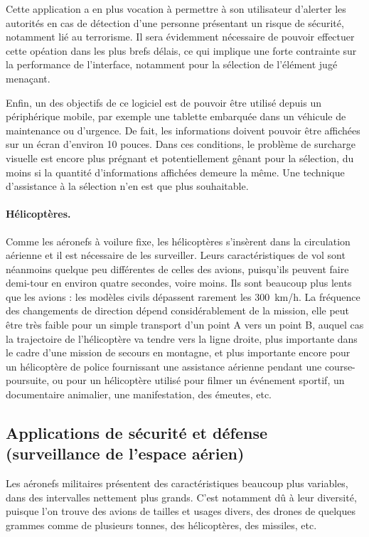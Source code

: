 	Cette application a en plus vocation à permettre à son utilisateur d'alerter les autorités en cas de détection d'une personne présentant un risque de sécurité, notamment lié au terrorisme. Il sera évidemment nécessaire de pouvoir effectuer cette opéation dans les plus brefs délais, ce qui implique une forte contrainte sur la performance de l'interface, notamment pour la sélection de l'élément jugé menaçant.
	
	Enfin, un des objectifs de ce logiciel est de pouvoir être utilisé depuis un périphérique mobile, par exemple une tablette embarquée dans un véhicule de maintenance ou d'urgence. De fait, les informations doivent pouvoir être affichées sur un écran d'environ 10 pouces. Dans ces conditions, le problème de surcharge visuelle est encore plus prégnant et potentiellement gênant pour la sélection, du moins si la quantité d'informations affichées demeure la même. Une technique d'assistance à la sélection n'en est que plus souhaitable.

	\paragraph{Hélicoptères.}
	Comme les aéronefs à voilure fixe, les hélicoptères s'insèrent dans la circulation aérienne et il est nécessaire de les surveiller. Leurs caractéristiques de vol sont néanmoins quelque peu différentes de celles des avions, puisqu'ils peuvent faire demi-tour en environ quatre secondes, voire moins. Ils sont beaucoup plus lents que les avions : les modèles civils dépassent rarement les 300~km/h. La fréquence des changements de direction dépend considérablement de la mission, elle peut être très faible pour un simple transport d'un point A vers un point B, auquel cas la trajectoire de l'hélicoptère va tendre vers la ligne droite, plus importante dans le cadre d'une mission de secours en montagne, et plus importante encore pour un hélicoptère de police fournissant une assistance aérienne pendant une course-poursuite, ou pour un hélicoptère utilisé pour filmer un événement sportif, un documentaire animalier, une manifestation, des émeutes, etc.
	
	\subsection{Applications de sécurité et défense (surveillance de l'espace aérien)}
	Les aéronefs militaires présentent des caractéristiques beaucoup plus variables, dans des intervalles nettement plus grands. C'est notamment dû à leur diversité, puisque l'on trouve des avions de tailles et usages divers, des drones de quelques grammes comme de plusieurs tonnes, des hélicoptères, des missiles, etc.
	
